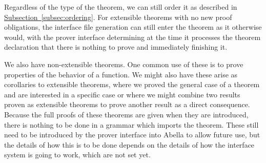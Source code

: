 \documentclass[11pt]{article}
\newcommand{\subsec}[1]{\hyperref[subsec:#1]{Subsection~\ref*{subsec:#1}}}
\begin{document}
Regardless of the type of the theorem, we can still order it as
described in \subsec{ordering}.
%
For extensible theorems with no new proof obligations, the interface
file generation can still enter the theorem as it otherwise would,
with the prover interface determining at the time it processes the
theorem declaration that there is nothing to prove and immediately
finishing it.


We also have non-extensible theorems.  One common use of these is to
prove properties of the behavior of a function.  We might also have
these arise as corollaries to extensible theorems, where we proved the
general case of a theorem and are interested in a specific case or
where we might combine two results proven as extensible theorems to
prove another result as a direct consequence.
%
Because the full proofs of these theorems are given when they are
introduced, there is nothing to be done in a grammar which imports the
theorem.  These still need to be introduced by the prover interface
into Abella to allow future use, but the details of how this is to be
done depends on the details of how the interface system is going to
work, which are not set yet.
\end{document}
